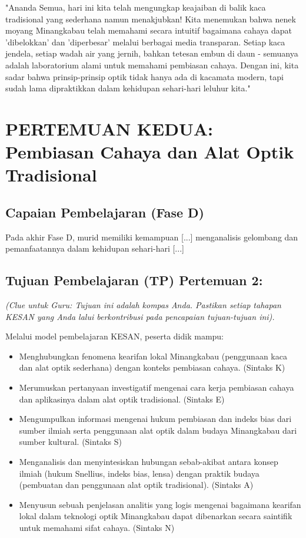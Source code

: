 \documentclass[12pt,a4paper]{article}
\begin{document}
"Ananda Semua, hari ini kita telah mengungkap keajaiban di balik kaca tradisional yang sederhana namun menakjubkan! Kita menemukan bahwa nenek moyang Minangkabau telah memahami secara intuitif bagaimana cahaya dapat 'dibelokkan' dan 'diperbesar' melalui berbagai media transparan. Setiap kaca jendela, setiap wadah air yang jernih, bahkan tetesan embun di daun - semuanya adalah laboratorium alami untuk memahami pembiasan cahaya. Dengan ini, kita sadar bahwa prinsip-prinsip optik tidak hanya ada di kacamata modern, tapi sudah lama dipraktikkan dalam kehidupan sehari-hari leluhur kita."

\section{PERTEMUAN KEDUA: Pembiasan Cahaya dan Alat Optik Tradisional}

\subsection{Capaian Pembelajaran (Fase D)}
Pada akhir Fase D, murid memiliki kemampuan [...] menganalisis gelombang dan pemanfaatannya dalam kehidupan sehari-hari [...]

\subsection{Tujuan Pembelajaran (TP) Pertemuan 2:}
\textit{(Clue untuk Guru: Tujuan ini adalah kompas Anda. Pastikan setiap tahapan KESAN yang Anda lalui berkontribusi pada pencapaian tujuan-tujuan ini).}

Melalui model pembelajaran KESAN, peserta didik mampu:
\begin{itemize}
\item Menghubungkan fenomena kearifan lokal Minangkabau (penggunaan kaca dan alat optik sederhana) dengan konteks pembiasan cahaya. (Sintaks K)
\item Merumuskan pertanyaan investigatif mengenai cara kerja pembiasan cahaya dan aplikasinya dalam alat optik tradisional. (Sintaks E)
\item Mengumpulkan informasi mengenai hukum pembiasan dan indeks bias dari sumber ilmiah serta penggunaan alat optik dalam budaya Minangkabau dari sumber kultural. (Sintaks S)
\item Menganalisis dan menyintesiskan hubungan sebab-akibat antara konsep ilmiah (hukum Snellius, indeks bias, lensa) dengan praktik budaya (pembuatan dan penggunaan alat optik tradisional). (Sintaks A)
\item Menyusun sebuah penjelasan analitis yang logis mengenai bagaimana kearifan lokal dalam teknologi optik Minangkabau dapat dibenarkan secara saintifik untuk memahami sifat cahaya. (Sintaks N)
\end{itemize}
\end{document}
